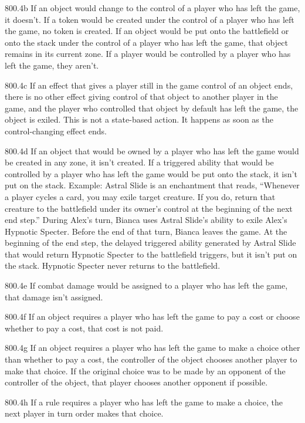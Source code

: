 800.4b If an object would change to the control of a player who has left the game, it doesn’t. If a token would be created under the control of a player who has left the game, no token is created. If an object would be put onto the battlefield or onto the stack under the control of a player who has left the game, that object remains in its current zone. If a player would be controlled by a player who has left the game, they aren’t.

800.4c If an effect that gives a player still in the game control of an object ends, there is no other effect giving control of that object to another player in the game, and the player who controlled that object by default has left the game, the object is exiled. This is not a state-based action. It happens as soon as the control-changing effect ends.

800.4d If an object that would be owned by a player who has left the game would be created in any zone, it isn’t created. If a triggered ability that would be controlled by a player who has left the game would be put onto the stack, it isn’t put on the stack.
Example: Astral Slide is an enchantment that reads, “Whenever a player cycles a card, you may exile target creature. If you do, return that creature to the battlefield under its owner’s control at the beginning of the next end step.” During Alex’s turn, Bianca uses Astral Slide’s ability to exile Alex’s Hypnotic Specter. Before the end of that turn, Bianca leaves the game. At the beginning of the end step, the delayed triggered ability generated by Astral Slide that would return Hypnotic Specter to the battlefield triggers, but it isn’t put on the stack. Hypnotic Specter never returns to the battlefield.

800.4e If combat damage would be assigned to a player who has left the game, that damage isn’t assigned.

800.4f If an object requires a player who has left the game to pay a cost or choose whether to pay a cost, that cost is not paid.

800.4g If an object requires a player who has left the game to make a choice other than whether to pay a cost, the controller of the object chooses another player to make that choice. If the original choice was to be made by an opponent of the controller of the object, that player chooses another opponent if possible.

800.4h If a rule requires a player who has left the game to make a choice, the next player in turn order makes that choice.

